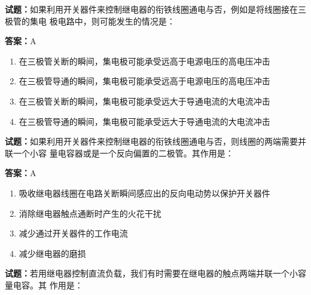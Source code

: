 \documentclass{ctexbook}
\begin{document}


\vspace{1em}

\textbf{试题：}如果利用开关器件来控制继电器的衔铁线圈通电与否，例如是将线圈接在三极管的集电
极电路中，则可能发生的情况是： 

\textbf{答案：}A 

\begin{enumerate}[leftmargin=3em]
  \item 在三极管关断的瞬间，集电极可能承受远高于电源电压的高电压冲击 

  \item 在三极管导通的瞬间，集电极可能承受远高于电源电压的高电压冲击 

  \item 在三极管关断的瞬间，集电极可能承受远大于导通电流的大电流冲击 

  \item 在三极管导通的瞬间，集电极可能承受远大于导通电流的大电流冲击 

\end{enumerate}





\vspace{1em}

\textbf{试题：}如果利用开关器件来控制继电器的衔铁线圈通电与否，则线圈的两端需要并联一个小容
量电容器或是一个反向偏置的二极管。其作用是： 

\textbf{答案：}A 

\begin{enumerate}[leftmargin=3em]
  \item 吸收继电器线圈在电路关断瞬间感应出的反向电动势以保护开关器件 

  \item 消除继电器触点通断时产生的火花干扰 

  \item 减少通过开关器件的工作电流 

  \item 减少继电器的磨损 

\end{enumerate}





\vspace{1em}

\textbf{试题：}若用继电器控制直流负载，我们有时需要在继电器的触点两端并联一个小容量电容。其
作用是： 
\end{document}
